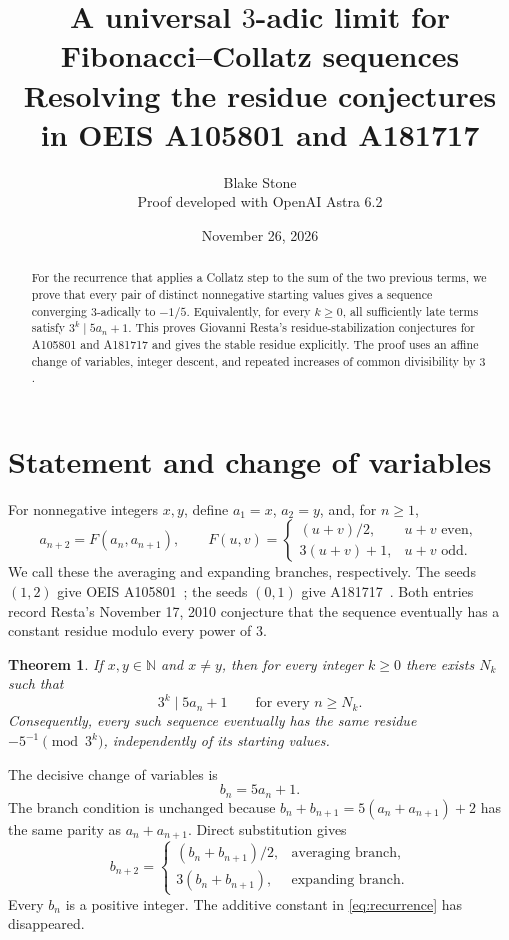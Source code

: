 \documentclass[11pt]{article}
\title{A universal $3$-adic limit for Fibonacci--Collatz sequences\\
\large Resolving the residue conjectures in OEIS A105801 and A181717}
\author{Blake Stone\\\normalsize Proof developed with OpenAI Astra 6.2}
\date{November 26, 2026}
\newtheorem{theorem}{Theorem}
\newcommand{\N}{\mathbb N}
\begin{document}
\maketitle
\begin{abstract}
For the recurrence that applies a Collatz step to the sum of the two previous
terms, we prove that every pair of distinct nonnegative starting values gives
a sequence converging $3$-adically to $-1/5$. Equivalently, for every $k\ge0$,
all sufficiently late terms satisfy $3^k\mid 5a_n+1$. This proves Giovanni
Resta's residue-stabilization conjectures for A105801 and A181717 and gives
the stable residue explicitly. The proof uses an affine change of variables,
integer descent, and repeated increases of common divisibility by $3$.
\end{abstract}

\section{Statement and change of variables}

For nonnegative integers $x,y$, define $a_1=x$, $a_2=y$, and, for $n\ge1$,
\begin{equation}
 a_{n+2}=F(a_n,a_{n+1}),\qquad
 F(u,v)=
 \begin{cases}
 (u+v)/2,&u+v\text{ even},\\
 3(u+v)+1,&u+v\text{ odd}.
 \end{cases}
 \label{eq:recurrence}
\end{equation}
We call these the averaging and expanding branches, respectively.
The seeds $(1,2)$ give OEIS A105801~\cite{A105801}; the seeds $(0,1)$ give
A181717~\cite{A181717}. Both entries record Resta's November 17, 2010
conjecture that the sequence eventually has a constant residue modulo
every power of $3$.

\begin{theorem}\label{thm:main}
If $x,y\in\N$ and $x\ne y$, then for every integer $k\ge0$ there exists
$N_k$ such that
\begin{equation}
 3^k\mid 5a_n+1\qquad\text{for every }n\ge N_k.
 \label{eq:divisibility}
\end{equation}
Consequently, every such sequence eventually has the same residue
$-5^{-1}\pmod{3^k}$, independently of its starting values.
\end{theorem}

The decisive change of variables is
\begin{equation}
 b_n=5a_n+1.
 \label{eq:change}
\end{equation}
The branch condition is unchanged because $b_n+b_{n+1}=5(a_n+a_{n+1})+2$
has the same parity as $a_n+a_{n+1}$. Direct substitution gives
\begin{equation}
 b_{n+2}=
 \begin{cases}
 (b_n+b_{n+1})/2,&\text{averaging branch},\\
 3(b_n+b_{n+1}),&\text{expanding branch}.
 \end{cases}
 \label{eq:transformed}
\end{equation}
Every $b_n$ is a positive integer. The additive constant in
\eqref{eq:recurrence} has disappeared.
\end{document}

